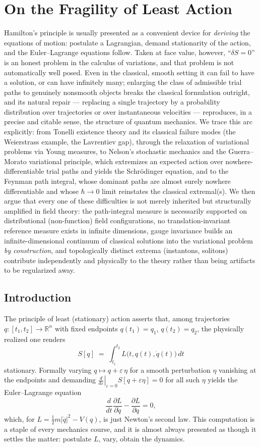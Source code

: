 
\section{On the Fragility of Least Action}

Hamilton's principle is usually presented as a convenient device for
\emph{deriving} the equations of motion: postulate a Lagrangian, demand
stationarity of the action, and the Euler--Lagrange equations follow. Taken at
face value, however, ``$\delta S=0$'' is an honest problem in the calculus of
variations, and that problem is not automatically well posed. Even in the
classical, smooth setting it can fail to have a solution, or can have
infinitely many; enlarging the class of admissible trial paths to genuinely
nonsmooth objects breaks the classical formulation outright, and its natural
repair --- replacing a single trajectory by a probability distribution over
trajectories or over instantaneous velocities --- reproduces, in a precise and
citable sense, the structure of quantum mechanics. We trace this arc
explicitly: from Tonelli existence theory and its classical failure modes (the
Weierstrass example, the Lavrentiev gap), through the relaxation of variational
problems via Young measures, to Nelson's stochastic mechanics and the
Guerra--Morato variational principle, which extremizes an expected action over
nowhere-differentiable trial paths and yields the Schr\"odinger equation, and
to the Feynman path integral, whose dominant paths are almost surely nowhere
differentiable and whose $\hbar\to 0$ limit reinstates the classical
extremal(s). We then argue that every one of these difficulties is not merely
inherited but structurally amplified in field theory: the path-integral measure
is necessarily supported on distributional (non-function) field configurations,
no translation-invariant reference measure exists in infinite dimensions, gauge
invariance builds an infinite-dimensional continuum of classical solutions into
the variational problem \emph{by construction}, and topologically distinct
extrema (instantons, solitons) contribute independently and physically to the
theory rather than being artifacts to be regularized away.

\subsection{Introduction}

The principle of least (stationary) action asserts that, among trajectories
$q:[t_1,t_2]\to\mathbb{R}^n$ with fixed endpoints $q(t_1)=q_1$, $q(t_2)=q_2$,
the physically realized one renders
\[
S[q] \;=\; \int_{t_1}^{t_2} L\bigl(t,q(t),\dot q(t)\bigr)\,dt
\]
stationary. Formally varying $q\mapsto q+\varepsilon\,\eta$ for a smooth
perturbation $\eta$ vanishing at the endpoints and demanding
$\left.\frac{d}{d\varepsilon}\right|_{\varepsilon=0}S[q+\varepsilon\eta]=0$ for
all such $\eta$ yields the Euler--Lagrange equation
\[
\frac{d}{dt}\frac{\partial L}{\partial \dot q} - \frac{\partial L}{\partial q} = 0,
\]
which, for $L=\tfrac12 m|\dot q|^2 - V(q)$, is just Newton's second law. This
computation is a staple of every mechanics course, and it is almost always
presented as though it settles the matter: postulate $L$, vary, obtain the
dynamics.

